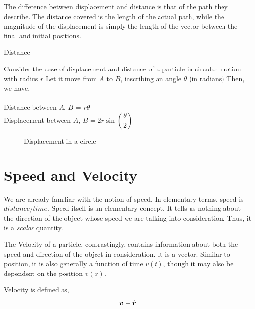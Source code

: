 The difference between displacement and distance is that of the path they describe. The distance covered is the length
of the actual path, while the magnitude of the displacement is simply the length of the vector between the final and initial positions.

\begin{marginfigure}
    \centering
    \caption{Distance}
\end{marginfigure}

\begin{algorithm}
    Consider the case of displacement and distance of a particle in circular motion with radius \(r\) Let it move from \(A\) to \(B\), inscribing
    an angle \(\theta\) (in radians) Then, we have,\\
    ~\\
    Distance between \(A\), \(B\) = \(r\theta\)\\
    Displacement between \(A\), \(B\) = \(2r\sin\left(\dfrac{\theta}{2}\right)\)
\end{algorithm}

\begin{figure}
    [H]
    \centering
    \caption{Displacement in a circle}
\end{figure}

\section{Speed and Velocity}


We are already familiar with the notion of speed. In elementary terms, speed is \({distance}/{time}\).
Speed itself is an elementary concept. It tells us nothing about the direction of the object whose speed we are
talking into consideration. Thus, it is a \emph{scalar} quantity.

\parbreak
{}


The Velocity of a particle, contrastingly, contains information about both the speed and direction of the
object in consideration. It is a vector. Similar to position, it is also generally a function of time \(v(t)\), though it
may also be dependent on the position \(v(x)\).

\begin{definition}
    [Velocity]
    \label{def: velocity}
    Velocity is defined as,
    \begin{equation}
        \boldsymbol{v} \equiv \dot{\boldsymbol{r}}    
    \end{equation}
\end{definition}

